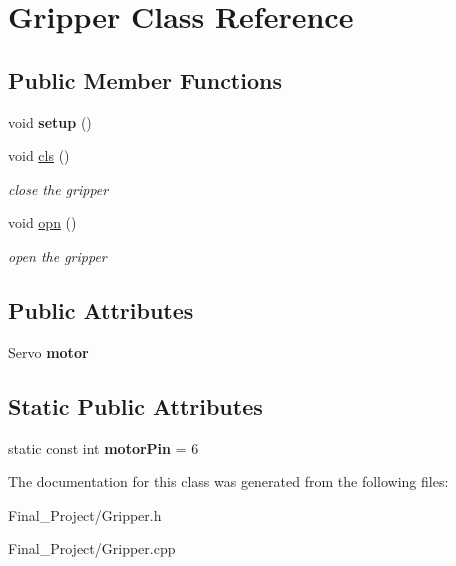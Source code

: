\hypertarget{classGripper}{\section{Gripper Class Reference}
\label{classGripper}
}
\subsection*{Public Member Functions}
\begin{DoxyCompactItemize}
\item 
\hypertarget{classGripper_a7eff7781d1109b4e988fa66c8141a6d7}{void {\bfseries setup} ()}\label{classGripper_a7eff7781d1109b4e988fa66c8141a6d7}

\item 
\hypertarget{classGripper_ada511826dbf5abcdd12532ae725efeaf}{void \hyperlink{classGripper_ada511826dbf5abcdd12532ae725efeaf}{cls} ()}\label{classGripper_ada511826dbf5abcdd12532ae725efeaf}

\begin{DoxyCompactList}\small\item\em close the gripper \end{DoxyCompactList}\item 
\hypertarget{classGripper_ab4fa689ad3f08e97c7fcd10247965ff5}{void \hyperlink{classGripper_ab4fa689ad3f08e97c7fcd10247965ff5}{opn} ()}\label{classGripper_ab4fa689ad3f08e97c7fcd10247965ff5}

\begin{DoxyCompactList}\small\item\em open the gripper \end{DoxyCompactList}\end{DoxyCompactItemize}
\subsection*{Public Attributes}
\begin{DoxyCompactItemize}
\item 
\hypertarget{classGripper_ad72d0ae4ccd2be00ec3f303e7a0c1cc9}{Servo {\bfseries motor}}\label{classGripper_ad72d0ae4ccd2be00ec3f303e7a0c1cc9}

\end{DoxyCompactItemize}
\subsection*{Static Public Attributes}
\begin{DoxyCompactItemize}
\item 
\hypertarget{classGripper_ae12467d04d155401f1c6ba694b295f40}{static const int {\bfseries motor\-Pin} = 6}\label{classGripper_ae12467d04d155401f1c6ba694b295f40}

\end{DoxyCompactItemize}


The documentation for this class was generated from the following files\-:\begin{DoxyCompactItemize}
\item 
Final\-\_\-\-Project/Gripper.\-h\item 
Final\-\_\-\-Project/Gripper.\-cpp\end{DoxyCompactItemize}
